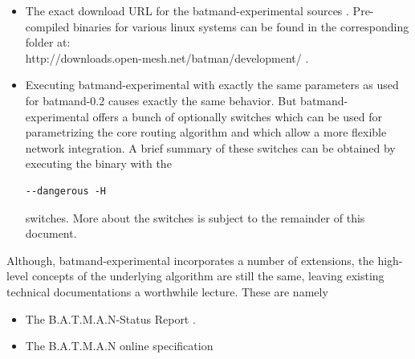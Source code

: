 \documentclass[11pt]{article}
\begin{document}
\begin{itemize}
 \item The exact download URL for the batmand-experimental sources \cite{bmx-source-url}.
Pre-compiled binaries for various linux systems can be found in the corresponding folder at:\\ 
http://downloads.open-mesh.net/batman/development/ .


\item Executing batmand-experimental with exactly the same parameters as used for batmand-0.2 causes exactly the same behavior. 
%
%
But batmand-experimental offers a bunch of optionally switches which can be used for parametrizing the core routing algorithm and which allow a more flexible network integration. A brief summary of these switches can be obtained by executing the binary with the 
%
\begin{small} 
\begin{verbatim} 
--dangerous -H
\end{verbatim} 
\end{small}
%
 switches. More about the switches is subject to the remainder of this document.



\end{itemize}
%
Although, batmand-experimental incorporates a number of extensions, the high-level concepts of the underlying algorithm are still the same, leaving existing technical documentations a worthwhile lecture. These are namely 
\begin{itemize}
 \item The B.A.T.M.A.N-Status Report \cite{batman-status-report}.
 \item The B.A.T.M.A.N online specification \cite{batman-specification-wiki}
\end{itemize}
\end{document}
